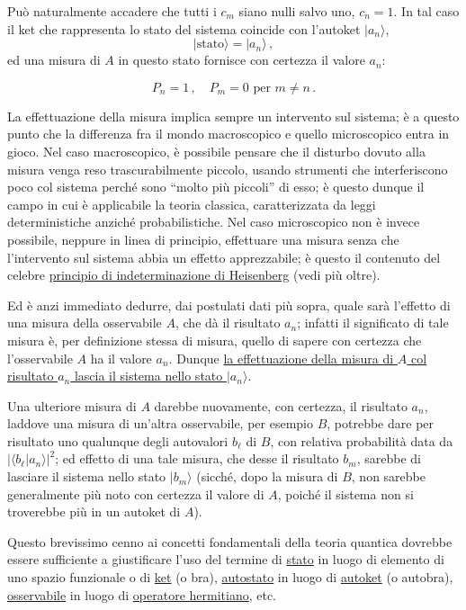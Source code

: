 \documentclass[11pt, a4paper]{book}
\numberwithin{equation}{section}
\begin{document}
Può naturalmente accadere che tutti i $c_m$ siano nulli salvo uno, $c_n=1$. In tal caso il ket che rappresenta lo stato del sistema coincide con l'autoket $|a_n\rangle$,
\begin{equation}
|\text{stato}\rangle = |a_n\rangle\,,
\end{equation}
ed una misura di $A$ in questo stato fornisce con certezza il valore $a_n$:

\begin{equation}
P_n = 1\,, \quad P_m = 0 \text{ per } m\ne n\,.
\end{equation}

La effettuazione della misura implica sempre un intervento sul sistema; è a questo punto che la differenza fra il mondo macroscopico e quello microscopico entra in gioco. Nel caso macroscopico, è possibile pensare che il disturbo dovuto alla misura venga reso trascurabilmente piccolo, usando strumenti che interferiscono poco col sistema perché sono ``molto più piccoli'' di esso; è questo dunque il campo in cui è applicabile la teoria classica, caratterizzata da leggi deterministiche anziché probabilistiche. Nel caso microscopico non è invece possibile, neppure in linea di principio, effettuare una misura senza che l'intervento sul sistema abbia un effetto apprezzabile; è questo il contenuto del celebre \uline{principio di indeterminazione di Heisenberg} (vedi più oltre).

Ed è anzi immediato dedurre, dai postulati dati più sopra, quale sarà l'effetto di una misura della osservabile $A$, che dà il risultato $a_n$; infatti il significato di tale misura è, per definizione stessa di misura, quello di sapere con certezza che l'osservabile $A$ ha il valore $a_n$. Dunque \uline{la effettuazione della misura di $A$ col risultato $a_n$ lascia il sistema nello stato $|a_n\rangle$}.

Una ulteriore misura di $A$ darebbe nuovamente, con certezza, il risultato $a_n$, laddove una misura di un'altra osservabile, per esempio $B$, potrebbe dare per risultato uno qualunque degli autovalori $b_\ell$ di $B$, con relativa probabilità data da $|\langle b_\ell|a_n\rangle|^2$; ed effetto di una tale misura, che desse il risultato $b_m$, sarebbe di lasciare il sistema nello stato $|b_m\rangle$ (sicché, dopo la misura di $B$, non sarebbe generalmente più noto con certezza il valore di $A$, poiché il sistema non si troverebbe più in un autoket di $A$).

Questo brevissimo cenno ai concetti fondamentali della teoria quantica dovrebbe essere sufficiente a giustificare l'uso del termine di \uline{stato} in luogo di elemento di uno spazio funzionale o di \uline{ket} (o bra), \uline{autostato} in luogo di \uline{autoket} (o autobra), \uline{osservabile} in luogo di \uline{operatore hermitiano}, etc.
\end{document}
